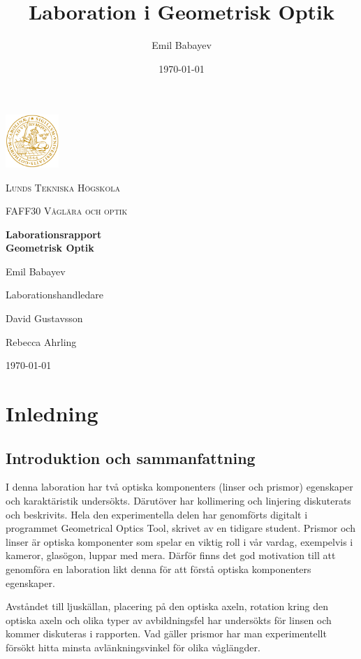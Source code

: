 \documentclass[a4paper]{article}
\title{Laboration i Geometrisk Optik}
\author{Emil Babayev}
\date{\today}
\begin{document}
\begin{titlepage}
	\centering
	\includegraphics[width=0.15\textwidth]{logo.png}\par\vspace{1cm}
	{\scshape\large Lunds Tekniska Högskola \par}
	\vspace{1cm}
    {\scshape\large FAFF30 Våglära och optik\par}
	\vspace{1.5cm}
	{\huge\bfseries Laborationsrapport\\Geometrisk Optik\par}
	\vspace{2cm}
	{\Large Emil Babayev\par}
	\vfill
	Laborationshandledare\par
    David Gustavsson \par
    Rebecca Ahrling

    \vfill
    
	{\large \today \par}
\end{titlepage}

\section{Inledning}
\subsection{Introduktion och sammanfattning}
I denna laboration har två optiska komponenters (linser och prismor) egenskaper och karaktäristik undersökts. Därutöver har kollimering och linjering diskuterats och beskrivits. Hela den experimentella delen har genomförts
digitalt i programmet Geometrical Optics Tool, skrivet av en tidigare student. Prismor och linser är optiska komponenter
som spelar en viktig roll i vår vardag, exempelvis i kameror, glasögon, luppar med mera. Därför finns det god motivation 
till att genomföra en laboration likt denna för att förstå optiska komponenters egenskaper.

Avståndet till ljuskällan, placering på den optiska axeln, rotation kring den optiska axeln och olika typer av avbildningsfel
har undersökts för linsen och kommer diskuteras i rapporten. Vad gäller prismor har man experimentellt försökt hitta minsta avlänkningsvinkel
för olika våglängder.
\end{document}
